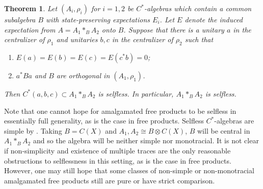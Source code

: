 \documentclass{amsart}
\newtheorem{theorem}{Theorem}[section]
\theoremstyle{definition}
\begin{document}
\begin{theorem}\label{thm: main thm AFP}
    Let $(A_i,\rho_i)$ for $i=1,2$ be $C^*$-algebras which contain a common subalgebra $B$ with state-preserving expectations $E_i$. Let $E$ denote the induced expectation from $A=A_1*_BA_2$ onto $B$. Suppose that there is a unitary $a$ in the centralizer of $\rho_1$ and unitaries $b,c$ in the centralizer of $\rho_2$ such that
    \begin{enumerate}
        \item $E(a) = E(b)=E(c)=E(c^*b)=0$;
        \item $a^*Ba$ and $B$ are orthogonal in $(A_1,\rho_1)$.
    \end{enumerate}
    Then $C^*(a,b,c) \subset A_1*_BA_2$ is selfless. In particular, $A_1*_B A_2$ is selfless.
\end{theorem}

    Note that one cannot hope for amalgamated free products to be selfless in essentially full generality, as is the case in free products. Selfless $C^*$-algebras are simple by \cite{robertselfless}. Taking $B=C(X)$ and $A_1,A_2 \cong B\otimes C(X)$, $B$ will be central in $A_1*_BA_2$ and so the algebra will be neither simple nor monotracial. It is not clear if non-simplicity and existence of multiple traces are the only reasonable obstructions to selflessness in this setting, as is the case in free products. However, one may still hope that some classes of non-simple or non-monotracial amalgamated free products still are pure or have strict comparison.
\end{document}

